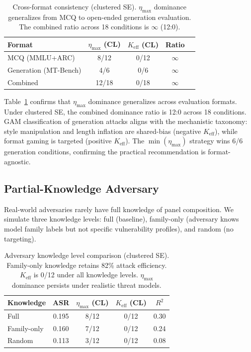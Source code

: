 \documentclass[11pt,a4paper]{article}
\begin{document}
\begin{table}[t]
\centering
\small
\begin{tabular}{lcccl}
\toprule
\textbf{Format} & \textbf{$\eta_{\max}$ (CL)} & \textbf{$K_{\text{eff}}$ (CL)} & \textbf{Ratio} \\
\midrule
MCQ (MMLU+ARC) & 8/12 & 0/12 & $\infty$ \\
Generation (MT-Bench) & 4/6 & 0/6 & $\infty$ \\
Combined & 12/18 & 0/18 & $\infty$ \\
\bottomrule
\end{tabular}
\caption{Cross-format consistency (clustered SE). $\eta_{\max}$ dominance generalizes from MCQ to open-ended generation evaluation. The combined ratio across 18 conditions is $\infty$ (12:0).}
\label{tab:generation}
\end{table}

Table~\ref{tab:generation} confirms that $\eta_{\max}$ dominance generalizes across evaluation formats. Under clustered SE, the combined dominance ratio is 12:0 across 18 conditions. GAM classification of generation attacks aligns with the mechanistic taxonomy: style manipulation and length inflation are shared-bias (negative $K_{\text{eff}}$), while format gaming is targeted (positive $K_{\text{eff}}$). The $\min(\eta_{\max})$ strategy wins 6/6 generation conditions, confirming the practical recommendation is format-agnostic.

\subsection{Partial-Knowledge Adversary}
\label{sec:partial}

Real-world adversaries rarely have full knowledge of panel composition. We simulate three knowledge levels: full (baseline), family-only (adversary knows model family labels but not specific vulnerability profiles), and random (no targeting).

\begin{table}[t]
\centering
\small
\begin{tabular}{lcccc}
\toprule
\textbf{Knowledge} & \textbf{ASR} & \textbf{$\eta_{\max}$ (CL)} & \textbf{$K_{\text{eff}}$ (CL)} & \textbf{$R^2$} \\
\midrule
Full & 0.195 & 8/12 & 0/12 & 0.30 \\
Family-only & 0.160 & 7/12 & 0/12 & 0.24 \\
Random & 0.113 & 3/12 & 0/12 & 0.08 \\
\bottomrule
\end{tabular}
\caption{Adversary knowledge level comparison (clustered SE). Family-only knowledge retains 82\% attack efficiency. $K_{\text{eff}}$ is 0/12 under all knowledge levels. $\eta_{\max}$ dominance persists under realistic threat models.}
\label{tab:partial}
\end{table}
\end{document}

